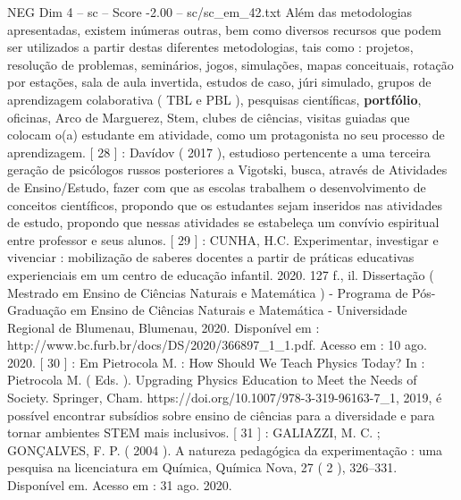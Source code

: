 \begin{textsample}{NEG Dim 4 – sc – Score -2.00 – sc/sc\_em\_42.txt}
Além das metodologias apresentadas, existem inúmeras outras, bem como diversos recursos que podem ser utilizados a partir destas diferentes metodologias, tais como : projetos, resolução de problemas, seminários, jogos, simulações, mapas conceituais, rotação por estações, sala de aula invertida, estudos de caso, júri simulado, grupos de aprendizagem colaborativa ( TBL e PBL ), pesquisas científicas, \textbf{portfólio}, oficinas, Arco de Marguerez, Stem, clubes de ciências, visitas guiadas que colocam o(a) estudante em atividade, como um protagonista no seu processo de aprendizagem. [ 28 ] : Davídov ( 2017 ), estudioso pertencente a uma terceira geração de psicólogos russos posteriores a Vigotski, busca, através de Atividades de Ensino/Estudo, fazer com que as escolas trabalhem o desenvolvimento de conceitos científicos, propondo que os estudantes sejam inseridos nas atividades de estudo, propondo que nessas atividades se estabeleça um convívio espiritual entre professor e seus alunos. [ 29 ] : CUNHA, H.C.
Experimentar, investigar e vivenciar : mobilização de saberes docentes a partir de práticas educativas experienciais em um centro de educação infantil. 2020. 127 f., il.
Dissertação ( Mestrado em Ensino de Ciências Naturais e Matemática ) - Programa de Pós-Graduação em Ensino de Ciências Naturais e Matemática - Universidade Regional de Blumenau, Blumenau, 2020.
Disponível em : http://www.bc.furb.br/docs/DS/2020/366897\_1\_1.pdf.
Acesso em : 10 ago. 2020. [ 30 ] : Em Pietrocola M. : How Should We Teach Physics Today?
In : Pietrocola M. ( Eds. ).
Upgrading Physics Education to Meet the Needs of Society.
Springer, Cham. https://doi.org/10.1007/978-3-319-96163-7\_1, 2019, é possível encontrar subsídios sobre ensino de ciências para a diversidade e para tornar ambientes STEM mais inclusivos. [ 31 ] : GALIAZZI, M.
C. ; GONÇALVES, F.
P. ( 2004 ).
A natureza pedagógica da experimentação : uma pesquisa na licenciatura em Química, Química Nova, 27 ( 2 ), 326–331.
Disponível em.
Acesso em : 31 ago. 2020.

\end{textsample}
